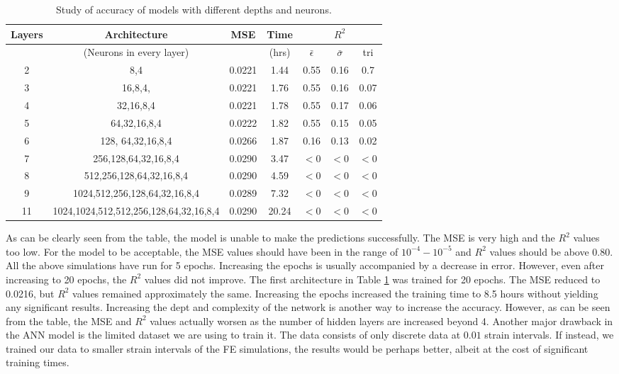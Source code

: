 \begin{table}
\begin{center}
\begin{tabular}{|c|c|c|c|c|c|c|}
\hline
Layers & Architecture & MSE & Time & \multicolumn{3}{c|}{$R^2$} \\
\hline
&(Neurons in every layer) & & (hrs)& ${\bar{\epsilon}}$ & $\bar{\sigma}$ & tri \\
\hline
2 & 8,4 & 0.0221 & 1.44 & 0.55 & 0.16 & 0.7 \\
3 & 16,8,4, & 0.0221 & 1.76 & 0.55 & 0.16 & 0.07 \\
4 & 32,16,8,4 & 0.0221 & 1.78 & 0.55 & 0.17 & 0.06 \\
5 & 64,32,16,8,4 & 0.0222 & 1.82 & 0.55 & 0.15 & 0.05 \\
6 & 128, 64,32,16,8,4 & 0.0266 & 1.87 & 0.16 & 0.13 & 0.02 \\
7 & 256,128,64,32,16,8,4 & 0.0290 & 3.47 & $<0$ & $<0$ & $<0$ \\
8 & 512,256,128,64,32,16,8,4 & 0.0290 & 4.59 & $<0$ & $<0$ & $<0$ \\
9 & 1024,512,256,128,64,32,16,8,4 & 0.0289 & 7.32 & $<0$ & $<0$ & $<0$ \\
11 & 1024,1024,512,512,256,128,64,32,16,8,4 & 0.0290 & 20.24 & $<0$ & $<0$ & $<0$ \\
\hline
\end{tabular}
\end{center}
\caption{\label{tab:diff-ann-table}Study of accuracy of models with different depths and neurons.}
\end{table}

As can be clearly seen from the table, the model is unable to make the predictions successfully. The MSE is very high and the $R^2$ values too low. For the model to be acceptable, the MSE values should have been in the range of $10^{-4} - 10^{-5}$ and $R^2$ values should be above $0.80$. All the above simulations have run for 5 epochs. Increasing the epochs is usually accompanied by a decrease in error. However, even after increasing to 20 epochs, the $R^2$ values did not improve. The first architecture in Table \ref{tab:diff-ann-table} was trained for 20 epochs. The MSE reduced to 0.0216, but $R^2$ values remained approximately the same. Increasing the epochs increased the training time to 8.5 hours without yielding any significant results.  Increasing the dept and complexity of the network is another way to increase the accuracy. However, as can be seen from the table, the MSE and $R^2$ values actually worsen as the number of hidden layers are increased beyond 4. Another major drawback in the ANN model is the limited dataset we are using to train it. The data consists of only discrete data at $0.01$ strain intervals. If instead, we trained our data to smaller strain intervals of the FE simulations, the results would be perhaps better, albeit at the cost of significant training times.

